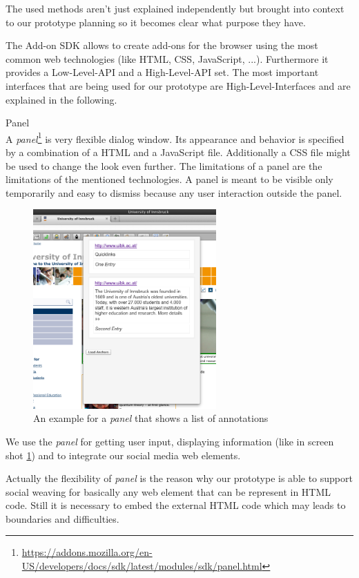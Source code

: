 The used methods aren't just explained independently but brought into context to our prototype planning so it becomes clear what purpose they have. 

The Add-on SDK allows to create add-ons for the browser using the most common web technologies (like HTML, CSS, JavaScript, ...). Furthermore it provides a Low-Level-API and a High-Level-API set. The most important interfaces that are being used for our prototype are High-Level-Interfaces and are explained in the following.

\begin{description}
\item Panel\\
A \emph{panel}\footnote{\url{https://addons.mozilla.org/en-US/developers/docs/sdk/latest/modules/sdk/panel.html}} is very flexible dialog window. Its appearance and behavior is specified by a combination of a HTML and a JavaScript file. Additionally a CSS file might be used to change the look even further. The limitations of a panel are the limitations of the mentioned technologies. 
A panel is meant to be visible only temporarily and easy to dismiss because any user interaction outside the panel.

\begin{figure}\centering
		\includegraphics[width=7cm]{images/example-panel.png}
		\caption{An example for a \emph{panel} that shows a list of annotations}
		\label{example-panel}
\end{figure} 

We use the \emph{panel} for getting user input, displaying information (like in screen shot \ref{example-panel}) and to integrate our social media web elements. 

Actually the flexibility of \emph{panel} is the reason why our prototype is able to support social weaving for basically any web element that can be represent in HTML code. Still it is necessary to embed the external HTML code which may leads to boundaries and difficulties.


\end{description}

